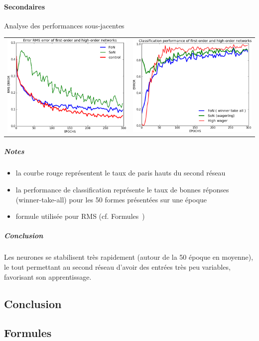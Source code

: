     \paragraph{Secondaires}
      Analyse des performances sous-jacentes
      \begin{center}
	\begin{tabular}{lr}
	  \hspace*{-1cm}
	  \includegraphics[width=250px]{data/expD3/rms.png}
	  &
	  \includegraphics[width=250px]{data/expD3/perf.png} 
	\end{tabular}
      \end{center} 
      \subparagraph{Notes}
	\begin{itemize}
	  \item la courbe rouge représentent le taux de paris hauts du second réseau
	  \item la performance de classification représente le taux de bonnes réponses (winner-take-all) pour les 50 formes présentées sur une époque
	  \item formule utilisée pour RMS (cf. Formules~)
	\end{itemize}
      \subparagraph{Conclusion}
	Les neurones se stabilisent très rapidement (autour de la 50 époque en moyenne), 
	le tout permettant au second réseau d'avoir des entrées très peu variables, favorisant
	son apprentissage.


  \subsection{Conclusion}
  
  

  \newpage 
  \subsection{Formules}
    
    
    
    


